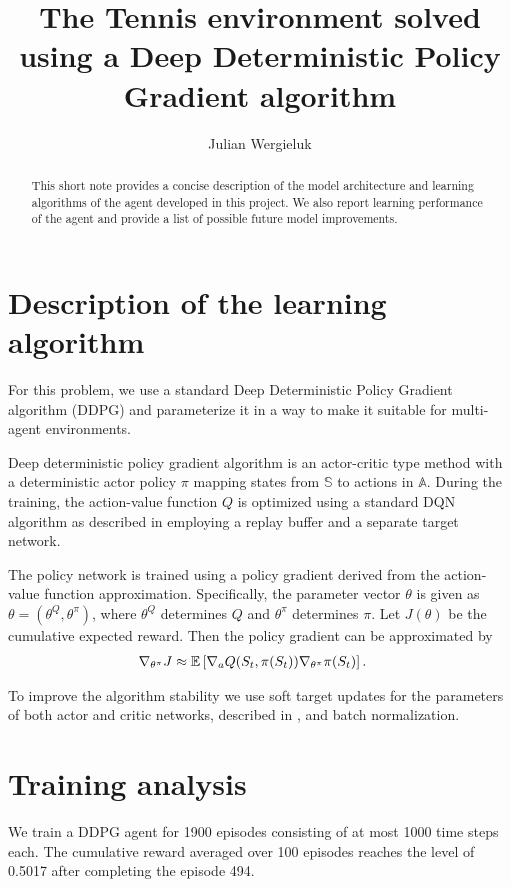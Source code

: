 \documentclass[a4paper,12pt]{amsart}
\title[Multi-Agent Deep Deterministic Policy Gradients]{The Tennis environment solved using a Deep Deterministic Policy Gradient algorithm}
\author{Julian Wergieluk}\address{}\email{julian.wergieluk@risklab.com}
\newcommand{\stateSpace}{\mathbb S}
\newcommand{\actionSpace}{\mathbb A}
\begin{document}
\maketitle

\begin{abstract}
This short note provides a concise description of the model architecture and
learning algorithms of the agent developed in this project. We also report learning
performance of the agent and provide a list of possible future model improvements.
\end{abstract}

\section{Description of the learning algorithm}

For this problem, we use a standard Deep Deterministic Policy Gradient 
algorithm (DDPG) and parameterize it in a way to make it suitable for multi-agent
environments.

Deep deterministic policy gradient algorithm is an actor-critic type method
with a deterministic actor policy $\pi$ mapping states from $\stateSpace$ to
actions in $\actionSpace$. During the training, the action-value
function $Q$ is optimized using a standard DQN algorithm as described in
\cite{mnih2015humanlevel} employing a replay buffer and a separate target
network.

The policy network is trained using a policy gradient derived from the action-value
function approximation. Specifically, the parameter vector $\theta$ is given as
$\theta = (\theta^{Q}, \theta^{\pi})$, where $\theta^{Q}$ determines $Q$ and
$\theta^{\pi}$ determines $\pi$. Let $J(\theta)$ be the cumulative expected 
reward. Then the policy gradient can be approximated by
\begin{align*}
    \nabla_{\theta^{\pi}} J & \approx
    \mathbb{E} \left[ \nabla_{a} Q(S_t, \pi(S_t)) \nabla_{\theta^\pi} \pi(S_t) \right].
\end{align*}

To improve the algorithm stability we use soft target updates for the
parameters of both actor and critic networks, described in
\cite{mnih2015humanlevel}, and batch normalization.

\section{Training analysis}

We train a DDPG agent for 1900 episodes consisting of at most 1000 time steps
each. The cumulative reward averaged over 100 episodes reaches the level of
0.5017 after completing the episode 494. 
\end{document}
